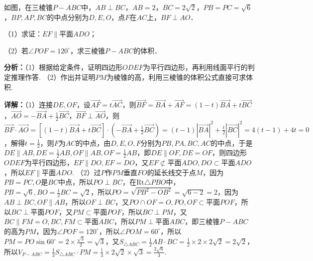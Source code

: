 \begin{question}[points=12]
如图，在三棱锥$P-ABC$中，$AB\perp BC$，$AB=2$，$BC=2\sqrt{2}$，$PB=PC=\sqrt{6}$，$BP, AP, BC$的中点分别为$D, E, O$，点$F$在$AC$上，$BF\perp AO$．

（1）求证：$EF\parallel$平面$ADO$；

（2）若$\angle POF=120^\circ$，求三棱锥$P-ABC$的体积．
\begin{solution}

\textbf{分析：}（1）根据给定条件，证明四边形$ODEF$为平行四边形，再利用线面平行的判定推理作答.
（2）作出并证明$PM$为棱锥的高，利用三棱锥的体积公式直接可求体积.

\textbf{详解：}（1）连接$DE, OF$，设$\overrightarrow{AF}=t\overrightarrow{AC}$，则$\overrightarrow{BF}=\overrightarrow{BA}+\overrightarrow{AF}=(1-t)\overrightarrow{BA}+t\overrightarrow{BC}$，$\overrightarrow{AO}=-\overrightarrow{BA}+\frac{1}{2}\overrightarrow{BC}$，$\overrightarrow{BF}\perp\overrightarrow{AO}$，则$\overrightarrow{BF}\cdot\overrightarrow{AO}=[(1-t)\overrightarrow{BA}+t\overrightarrow{BC}]\cdot(-\overrightarrow{BA}+\frac{1}{2}\overrightarrow{BC})=(t-1)|\overrightarrow{BA}|^2+\frac{t}{2}|\overrightarrow{BC}|^2=4(t-1)+4t=0$，解得$t=\frac{1}{2}$，则$F$为$AC$的中点，由$D,E,O,F$分别为$PB,PA,BC,AC$的中点，于是$DE\parallel AB, DE=\frac{1}{2}AB, OF\parallel AB, OF=\frac{1}{2}AB$，即$DE\parallel OF, DE=OF$，则四边形$ODEF$为平行四边形，$EF\parallel DO, EF=DO$，又$EF\not\subset$平面$ADO, DO\subset$平面$ADO$，所以$EF\parallel$平面$ADO$.
（2）过$P$作$PM$垂直$FO$的延长线交于点$M$，因为$PB=PC, O$是$BC$中点，所以$PO\perp BC$，在$\mathrm{Rt}\triangle PBO$中，$PB=\sqrt{6}, BO=\frac{1}{2}BC=\sqrt{2}$，所以$PO=\sqrt{PB^2-OB^2}=\sqrt{6-2}=2$，因为$AB\perp BC, OF\parallel AB$，所以$OF\perp BC$，又$PO\cap OF=O, PO,OF\subset$平面$POF$，所以$BC\perp$平面$POF$，又$PM\subset$平面$POF$，所以$BC\perp PM$，又$BC\parallel FM=O, BC,FM\subset$平面$ABC$，所以$PM\perp$平面$ABC$，即三棱锥$P-ABC$的高为$PM$，因为$\angle POF=120^\circ$，所以$\angle POM=60^\circ$，所以$PM=PO\sin60^\circ=2\times\frac{\sqrt{3}}{2}=\sqrt{3}$，又$S_{\triangle ABC}=\frac{1}{2}AB\cdot BC=\frac{1}{2}\times2\times2\sqrt{2}=2\sqrt{2}$，所以$V_{P-ABC}=\frac{1}{3}S_{\triangle ABC}\cdot PM=\frac{1}{3}\times2\sqrt{2}\times\sqrt{3}=\frac{2\sqrt{6}}{3}$.
\end{solution}
\end{question}

